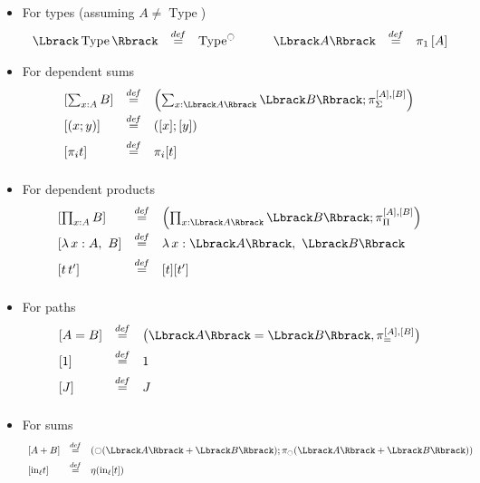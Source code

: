 \documentclass[preprint,9pt,numbers]{sigplanconf}
\newcommand \defeq {\overset{de\hspace{-0.2ex}f}{=}}
\DeclareMathOperator{\Type}{Type}
\newcommand{\modal}{\ensuremath{\ocircle}}
\begin{document}
\begin{itemize}
\item For types (assuming $A \neq \Type$) 
\[
\begin{array}{lcllcl}
  \Lbrack \Type\Rbrack &\defeq& \Type^\modal & \qquad 
  \Lbrack A \Rbrack &\defeq& \pi_1 \left[ A \right]
\end{array}
\]

\item For dependent sums
\[
\begin{array}{lcl}
\left[ \sum_{x:A} B \right] &\defeq&  \left( \sum_{x:\Lbrack A \Rbrack}
                                  \Lbrack B\Rbrack ; \pi_\Sigma^{[A],[B]}
                                \right)\\[0.5em]
  \left[  (x;y)\right] &\defeq& ([x];[y]) \\[0.5em]
  \left[  \pi_i t\right] &\defeq& \pi_i [t] \\[0.5em]
\end{array}
\]
\item For dependent products
\[
\begin{array}{lcl}
 \left[ \prod_{x:A} B \right] &\defeq& \left( \prod_{x:\Lbrack A \Rbrack}
                                   \Lbrack B\Rbrack ; \pi_{\Pi}^{[A],[B]}
                                  \right)\\[0.5em]
\left[  \lambda\, x:A,~B \right] &\defeq&\lambda\,x:\Lbrack A
                                     \Rbrack,~\Lbrack B\Rbrack
  \\[0.5em]
  \left[ t \, t' \right] &\defeq& [t] [t'] \\[0.5em]
\end{array}
\]
\item For paths
\[
\begin{array}{lcl}
\left[  A=B \right] &\defeq& \left( \Lbrack A \Rbrack = \Lbrack B
                             \Rbrack , \pi_=^{[A],[B]}
                             \right)\\[0.5em]
\left[ 1 \right] &\defeq& 1\\[0.5em]
\left[ J \right] &\defeq& J \\[0.5em]
\end{array}
\]
\item For sums
\[
\begin{array}{lcl}
\left[  A+B \right] &\defeq& \left( \modal(\Lbrack A \Rbrack + \Lbrack B
                        \Rbrack); \pi_\modal(\Lbrack A \Rbrack + \Lbrack B
                        \Rbrack)\right)\\[0.5em]
\left[  \mathrm{in}_\ell t \right] &\defeq& \eta (\mathrm{in}_\ell [t]) \\[0.5em]

\end{array}\]
\end{itemize}
\end{document}
